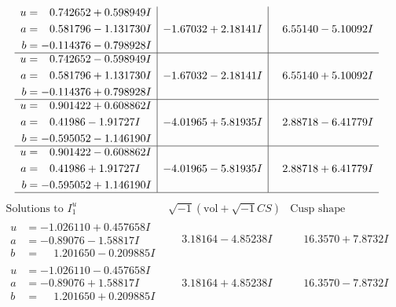 \documentclass[1p]{elsarticle_modified}
\theoremstyle{definition}
\newcommand{\I}{\sqrt{-1}}
\begin{document}
$$\begin{array}{c|c|c}
\begin{aligned}
u &= \phantom{-}0.742652 + 0.598949 I \\
a &= \phantom{-}0.581796 - 1.131730 I \\
b &= -0.114376 - 0.798928 I\end{aligned}
 & -1.67032 + 2.18141 I & \phantom{-}6.55140 - 5.10092 I \\ \hline\begin{aligned}
u &= \phantom{-}0.742652 - 0.598949 I \\
a &= \phantom{-}0.581796 + 1.131730 I \\
b &= -0.114376 + 0.798928 I\end{aligned}
 & -1.67032 - 2.18141 I & \phantom{-}6.55140 + 5.10092 I \\ \hline\begin{aligned}
u &= \phantom{-}0.901422 + 0.608862 I \\
a &= \phantom{-}0.41986 - 1.91727 I \\
b &= -0.595052 - 1.146190 I\end{aligned}
 & -4.01965 + 5.81935 I & \phantom{-}2.88718 - 6.41779 I \\ \hline\begin{aligned}
u &= \phantom{-}0.901422 - 0.608862 I \\
a &= \phantom{-}0.41986 + 1.91727 I \\
b &= -0.595052 + 1.146190 I\end{aligned}
 & -4.01965 - 5.81935 I & \phantom{-}2.88718 + 6.41779 I\\
 \hline 
 \end{array}$$\newpage$$\begin{array}{c|c|c}  
\text{Solutions to }I^u_{1}& \I (\text{vol} + \sqrt{-1}CS) & \text{Cusp shape}\\
 \hline 
\begin{aligned}
u &= -1.026110 + 0.457658 I \\
a &= -0.89076 - 1.58817 I \\
b &= \phantom{-}1.201650 - 0.209885 I\end{aligned}
 & \phantom{-}3.18164 - 4.85238 I & \phantom{-}16.3570 + 7.8732 I \\ \hline\begin{aligned}
u &= -1.026110 - 0.457658 I \\
a &= -0.89076 + 1.58817 I \\
b &= \phantom{-}1.201650 + 0.209885 I\end{aligned}
 & \phantom{-}3.18164 + 4.85238 I & \phantom{-}16.3570 - 7.8732 I \\ \hline\begin{aligned}

\end{aligned}
\end{array}$$
\end{document}

